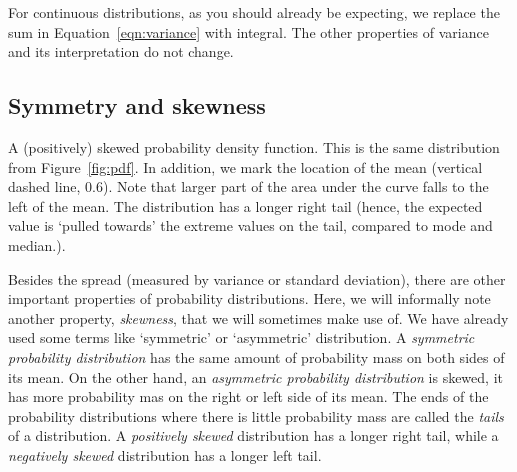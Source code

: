 For continuous distributions,
as you should already be expecting,
we replace the sum in Equation~\ref{eqn:variance} with integral.
The other properties of variance and its interpretation do not change.

\subsection{Symmetry and skewness}

\begin{marginfigure}
  \caption{\label{fig:skewed-pdf}
    A (positively) skewed probability density function.
    This is the same distribution from Figure~\ref{fig:pdf}.
    In addition, we mark the location of the mean
    (vertical dashed line, \num{0.6}).
    Note that larger part of the area under the curve falls
    to the left of the mean.
    The distribution has a longer right tail
    (hence, the expected value is
     `pulled towards' the extreme values on the tail,
     compared to mode and median.).
  }
\end{marginfigure}
Besides the spread (measured by variance or standard deviation),
there are other important properties of probability distributions.
Here,
we will informally note another property, \emph{skewness},
that we will sometimes make use of. 
We have already used some terms like `symmetric' or `asymmetric' distribution.
A \emph{symmetric probability distribution} has the same amount of probability mass on both sides of its mean.
On the other hand,
an \emph{asymmetric probability distribution} is skewed,
it has more probability mas on the right or left side of its mean.
The ends of the probability distributions where there is little probability mass are called the \emph{tails} of a distribution.
A \emph{positively skewed} distribution has a longer right tail,
while a \emph{negatively skewed} distribution has a longer left tail.

